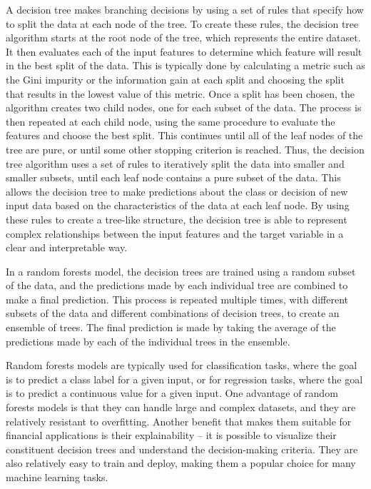 \documentclass[10pt]{article}
\theoremstyle{definition}
\begin{document}
A decision tree makes branching decisions by using a set of rules that specify how to split the data at each node of the tree. To create these rules, the decision tree algorithm starts at the root node of the tree, which represents the entire dataset. It then evaluates each of the input features to determine which feature will result in the best split of the data. This is typically done by calculating a metric such as the Gini impurity or the information gain at each split and choosing the split that results in the lowest value of this metric. Once a split has been chosen, the algorithm creates two child nodes, one for each subset of the data. The process is then repeated at each child node, using the same procedure to evaluate the features and choose the best split. This continues until all of the leaf nodes of the tree are pure, or until some other stopping criterion is reached. Thus, the decision tree algorithm uses a set of rules to iteratively split the data into smaller and smaller subsets, until each leaf node contains a pure subset of the data. This allows the decision tree to make predictions about the class or decision of new input data based on the characteristics of the data at each leaf node. By using these rules to create a tree-like structure, the decision tree is able to represent complex relationships between the input features and the target variable in a clear and interpretable way.

In a random forests model, the decision trees are trained using a random subset of the data, and the predictions made by each individual tree are combined to make a final prediction. This process is repeated multiple times, with different subsets of the data and different combinations of decision trees, to create an ensemble of trees. The final prediction is made by taking the average of the predictions made by each of the individual trees in the ensemble.

Random forests models are typically used for classification tasks, where the goal is to predict a class label for a given input, or for regression tasks, where the goal is to predict a continuous value for a given input. One advantage of random forests models is that they can handle large and complex datasets, and they are relatively resistant to overfitting. Another benefit that makes them suitable for financial applications is their explainability -- it is possible to visualize their constituent decision trees and understand the decision-making criteria. They are also relatively easy to train and deploy, making them a popular choice for many machine learning tasks.
\end{document}
